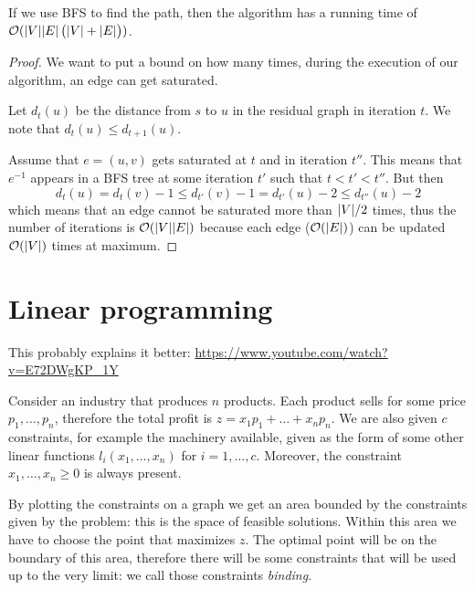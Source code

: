 \documentclass[12pt]{extarticle}
\begin{document}
\begin{theorem}
    If we use BFS to find the path, then the algorithm has a running time of $\mathcal{O}(\abs{V} \abs{E} \left( \abs{V} + \abs{E} \right))$.
\end{theorem}

\begin{proof}
    We want to put a bound on how many times, during the execution of our algorithm, an edge can get saturated.

    Let $d_t(u)$ be the distance from $s$ to $u$ in the residual graph in iteration $t$.
    We note that $d_t(u) \leq d_{t+1}(u)$.

    Assume that $e = (u, v)$ gets saturated at $t$ and in iteration $t''$.
    This means that $e^{-1}$ appears in a BFS tree at some iteration $t'$ such that $t < t' < t''$.
    But then
    \begin{equation}
        d_t(u) = d_t(v)-1 \leq d_{t'}(v)-1 = d_{t'}(u)-2 \leq d_{t''}(u)-2
    \end{equation}
    which means that an edge cannot be saturated more than $\abs{V}/2$ times,
    thus the number of iterations is $\mathcal{O}(\abs{V}\abs{E})$ because each edge ($\mathcal{O}(\abs{E})$) can be updated $\mathcal{O}(\abs{V})$ times at maximum.
\end{proof}

\section{Linear programming}

This probably explains it better:
\url{https://www.youtube.com/watch?v=E72DWgKP_1Y}


Consider an industry that produces $n$ products.
Each product sells for some price $p_1, \ldots, p_n$, therefore the total profit is $z = x_1 p_1 + \dots + x_n p_n$.
We are also given $c$ constraints, for example the machinery available, given as the form of some other linear functions $l_i(x_1, \ldots, x_n)$ for $i = 1, \ldots, c$.
Moreover, the constraint $x_1, \ldots, x_n \geq 0$ is always present.

By plotting the constraints on a graph we get an area bounded by the constraints given by the problem: this is the space of feasible solutions.
Within this area we have to choose the point that maximizes $z$.
The optimal point will be on the boundary of this area, therefore there will be some constraints that will be used up to the very limit: we call those  constraints \textit{binding}.
\end{document}
